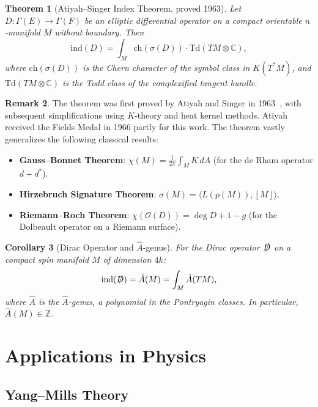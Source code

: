 \documentclass[12pt,a4paper]{amsart}
\newtheorem{theorem}{Theorem}[section]
\newtheorem{corollary}[theorem]{Corollary}
\theoremstyle{definition}
\newtheorem{remark}[theorem]{Remark}
\begin{document}
\begin{theorem}[Atiyah--Singer Index Theorem, proved 1963]
\label{thm:atiyah}
Let $D \colon \Gamma(E) \to \Gamma(F)$ be an elliptic differential operator
on a compact orientable $n$-manifold $M$ without boundary. Then
\[
  \mathrm{ind}(D) = \int_M \mathrm{ch}(\sigma(D)) \cdot \mathrm{Td}(TM \otimes \mathbb{C}),
\]
where $\mathrm{ch}(\sigma(D))$ is the Chern character of the symbol class in
$K(T^*M)$, and $\mathrm{Td}(TM \otimes \mathbb{C})$ is the Todd class of
the complexified tangent bundle.
\end{theorem}

\begin{remark}
The theorem was first proved by Atiyah and Singer in 1963~\cite{atiyahsinger1963},
with subsequent simplifications using $K$-theory and heat kernel methods. Atiyah
received the Fields Medal in 1966 partly for this work. The theorem vastly
generalizes the following classical results:
\begin{itemize}[noitemsep]
  \item \textbf{Gauss--Bonnet Theorem}: $\chi(M) = \frac{1}{2\pi}\int_M K\, dA$
        (for the de Rham operator $d + d^*$).
  \item \textbf{Hirzebruch Signature Theorem}: $\sigma(M) = \langle L(p(M)), [M]\rangle$.
  \item \textbf{Riemann--Roch Theorem}: $\chi(\mathcal{O}(D)) = \deg D + 1 - g$
        (for the Dolbeault operator on a Riemann surface).
\end{itemize}
\end{remark}

\begin{corollary}[Dirac Operator and $\hat{A}$-genus]
For the Dirac operator $\slashed{D}$ on a compact spin manifold $M$ of dimension $4k$:
\[
  \mathrm{ind}(\slashed{D}) = \hat{A}(M) = \int_M \hat{A}(TM),
\]
where $\hat{A}$ is the $\hat{A}$-genus, a polynomial in the Pontryagin classes.
In particular, $\hat{A}(M) \in \mathbb{Z}$.
\end{corollary}

\section{Applications in Physics}
\label{sec:physics}

\subsection{Yang--Mills Theory}
\end{document}

